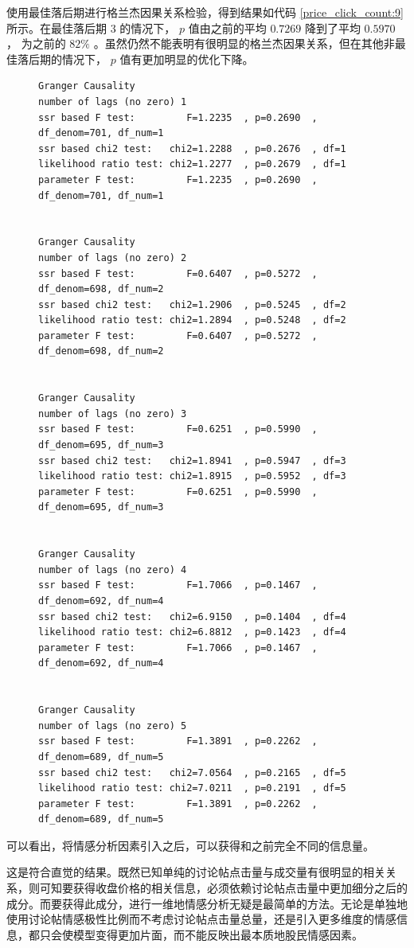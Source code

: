 使用最佳落后期进行格兰杰因果关系检验，得到结果如代码 \ref{price_click_count:9} 所示。在最佳落后期 $3$ 的情况下， $p$ 值由之前的平均 $0.7269$ 降到了平均 $0.5970$ ， 为之前的 $82\%$ 。虽然仍然不能表明有很明显的格兰杰因果关系，但在其他非最佳落后期的情况下， $p$ 值有更加明显的优化下降。

\begin{figure}
  \begin{minipage}{\textwidth}
    \begin{lstlisting}[caption=浦发银行 (600000) 价格与积极讨论帖点击量检验结果, label=price_click_count:9]
Granger Causality
number of lags (no zero) 1
ssr based F test:         F=1.2235  , p=0.2690  , df_denom=701, df_num=1
ssr based chi2 test:   chi2=1.2288  , p=0.2676  , df=1
likelihood ratio test: chi2=1.2277  , p=0.2679  , df=1
parameter F test:         F=1.2235  , p=0.2690  , df_denom=701, df_num=1


Granger Causality
number of lags (no zero) 2
ssr based F test:         F=0.6407  , p=0.5272  , df_denom=698, df_num=2
ssr based chi2 test:   chi2=1.2906  , p=0.5245  , df=2
likelihood ratio test: chi2=1.2894  , p=0.5248  , df=2
parameter F test:         F=0.6407  , p=0.5272  , df_denom=698, df_num=2


Granger Causality
number of lags (no zero) 3
ssr based F test:         F=0.6251  , p=0.5990  , df_denom=695, df_num=3
ssr based chi2 test:   chi2=1.8941  , p=0.5947  , df=3
likelihood ratio test: chi2=1.8915  , p=0.5952  , df=3
parameter F test:         F=0.6251  , p=0.5990  , df_denom=695, df_num=3


Granger Causality
number of lags (no zero) 4
ssr based F test:         F=1.7066  , p=0.1467  , df_denom=692, df_num=4
ssr based chi2 test:   chi2=6.9150  , p=0.1404  , df=4
likelihood ratio test: chi2=6.8812  , p=0.1423  , df=4
parameter F test:         F=1.7066  , p=0.1467  , df_denom=692, df_num=4


Granger Causality
number of lags (no zero) 5
ssr based F test:         F=1.3891  , p=0.2262  , df_denom=689, df_num=5
ssr based chi2 test:   chi2=7.0564  , p=0.2165  , df=5
likelihood ratio test: chi2=7.0211  , p=0.2191  , df=5
parameter F test:         F=1.3891  , p=0.2262  , df_denom=689, df_num=5
    \end{lstlisting}
  \end{minipage}
\end{figure}

可以看出，将情感分析因素引入之后，可以获得和之前完全不同的信息量。

这是符合直觉的结果。既然已知单纯的讨论帖点击量与成交量有很明显的相关关系，则可知要获得收盘价格的相关信息，必须依赖讨论帖点击量中更加细分之后的成分。而要获得此成分，进行一维地情感分析无疑是最简单的方法。无论是单独地使用讨论帖情感极性比例而不考虑讨论帖点击量总量，还是引入更多维度的情感信息，都只会使模型变得更加片面，而不能反映出最本质地股民情感因素。

